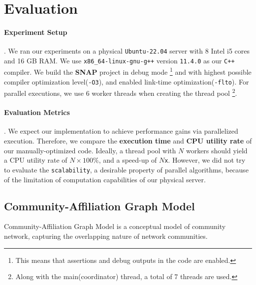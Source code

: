 \section{Evaluation}\label{sec:evaluation}

\paragraph{Experiment Setup}. We ran our experiments on a physical
\texttt{Ubuntu-22.04} server with 8 Intel i5 cores and 16 GB RAM. We use 
\texttt{x86\_64-linux-gnu-g++} version \texttt{11.4.0} as our \texttt{C++} compiler.
We build the \textbf{SNAP} project in debug mode
\footnote{This means that assertions and debug outputs in the code are enabled.}
and with highest possible compiler optimization  level(\texttt{-O3}), and 
enabled link-time optimization(\texttt{-flto}).
For parallel executions, we use $6$ worker threads when creating the thread
pool
\footnote{Along with the main(coordinator) thread, a total of 7 threads 
are used.}.

\paragraph{Evaluation Metrics}. We expect our implementation to achieve 
performance gains via parallelized execution. Therefore, we compare the 
\textbf{execution time} and \textbf{CPU utility rate} of our 
manually-optimized code. Ideally, a thread pool with $N$ workers should yield
a CPU utility rate of $N\times 100\%$, and a speed-up of $N$\texttt{x}. However,
we did not try to evaluate the \texttt{scalability}, a desirable property of 
parallel algorithms, because of the limitation of computation capabilities of
 our physical server.

\subsection{Community-Affiliation Graph Model}

\par Community-Affiliation Graph Model\citep{yang2012structure,yang2012community} 
is a conceptual model of community network, capturing the overlapping nature of 
network communities.



